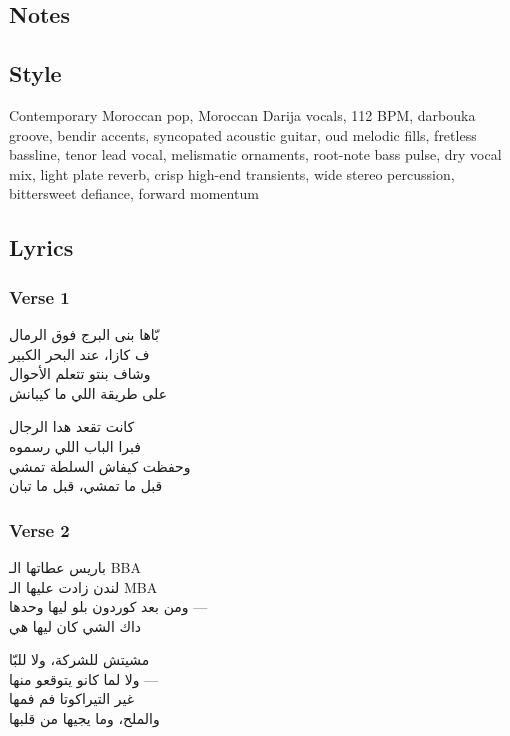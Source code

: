 \documentclass[]{article}
\begin{document}
\subsection{Notes}\label{notes-34}

\subsection{Style}\label{style-34}

Contemporary Moroccan pop, Moroccan Darija vocals, 112 BPM, darbouka
groove, bendir accents, syncopated acoustic guitar, oud melodic fills,
fretless bassline, tenor lead vocal, melismatic ornaments, root-note
bass pulse, dry vocal mix, light plate reverb, crisp high-end
transients, wide stereo percussion, bittersweet defiance, forward
momentum

\subsection{Lyrics}\label{lyrics-34}

\subsubsection{Verse 1}\label{verse-1-23}

{\arabicfont بّاها بنى البرج فوق الرمال\\
ف كازا، عند البحر الكبير\\
وشاف بنتو تتعلم الأحوال\\
على طريقة اللي ما كيبانش}

{\arabicfont كانت تقعد هدا الرجال\\
فبرا الباب اللي رسموه\\
وحفظت كيفاش السلطة تمشي\\
قبل ما تمشي، قبل ما تبان}

\subsubsection{Verse 2}\label{verse-2-20}

{\arabicfont باريس عطاتها الـ BBA\\
لندن زادت عليها الـ MBA\\
ومن بعد كوردون بلو ليها وحدها ---\\
داك الشي كان ليها هي}

{\arabicfont مشيتش للشركة، ولا للبّا\\
ولا لما كانو يتوقعو منها ---\\
غير التيراكوتا فم فمها\\
والملح، وما يجيها من قلبها}
\end{document}
